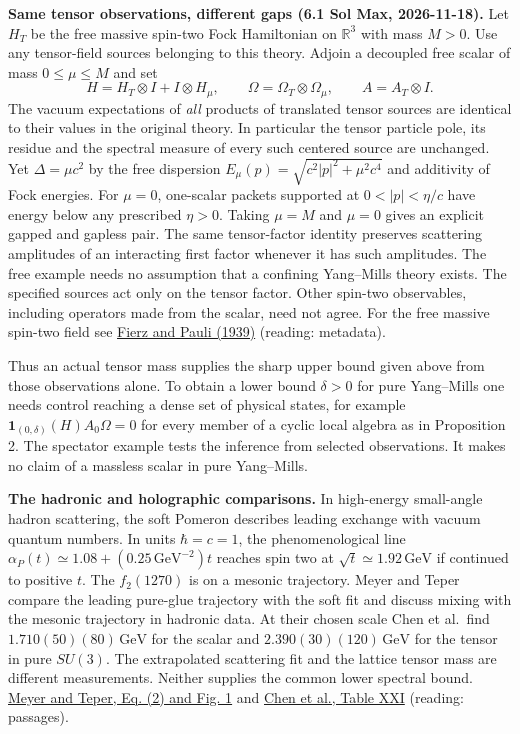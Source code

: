 \documentclass[11pt,a4paper]{article}
\begin{document}
\textbf{Same tensor observations, different gaps (6.1 Sol Max,
2026-11-18).} Let \(H_T\) be the free massive spin-two Fock Hamiltonian
on \(\mathbb R^3\) with mass \(M>0\). Use any tensor-field sources
belonging to this theory. Adjoin a decoupled free scalar of mass
\(0\le\mu\le M\) and set \[
 H=H_T\otimes I+I\otimes H_\mu,\qquad
 \Omega=\Omega_T\otimes\Omega_\mu,\qquad A=A_T\otimes I .
\] The vacuum expectations of \emph{all} products of translated tensor
sources are identical to their values in the original theory. In
particular the tensor particle pole, its residue and the spectral
measure of every such centered source are unchanged. Yet
\(\Delta=\mu c^2\) by the free dispersion
\(E_\mu(p)=\sqrt{c^2|p|^2+\mu^2c^4}\) and additivity of Fock energies.
For \(\mu=0\), one-scalar packets supported at \(0<|p|<\eta/c\) have
energy below any prescribed \(\eta>0\). Taking \(\mu=M\) and \(\mu=0\)
gives an explicit gapped and gapless pair. The same tensor-factor
identity preserves scattering amplitudes of an interacting first factor
whenever it has such amplitudes. The free example needs no assumption
that a confining Yang--Mills theory exists. The specified sources act
only on the tensor factor. Other spin-two observables, including
operators made from the scalar, need not agree. For the free massive
spin-two field see \href{https://doi.org/10.1098/rspa.1939.0140}{Fierz
and Pauli (1939)} (reading: metadata).

Thus an actual tensor mass supplies the sharp upper bound given above
from those observations alone. To obtain a lower bound \(\delta>0\) for
pure Yang--Mills one needs control reaching a dense set of physical
states, for example \(\mathbf1_{(0,\delta)}(H)A_0\Omega=0\) for every
member of a cyclic local algebra as in Proposition 2. The spectator
example tests the inference from selected observations. It makes no
claim of a massless scalar in pure Yang--Mills.

\textbf{The hadronic and holographic comparisons.} In high-energy
small-angle hadron scattering, the soft Pomeron describes leading
exchange with vacuum quantum numbers. In units \(\hbar=c=1\), the
phenomenological line
\(\alpha_P(t)\simeq1.08+(0.25\,\mathrm{GeV}^{-2})t\) reaches spin two at
\(\sqrt t\simeq1.92\,\mathrm{GeV}\) if continued to positive \(t\). The
\(f_2(1270)\) is on a mesonic trajectory. Meyer and Teper compare the
leading pure-glue trajectory with the soft fit and discuss mixing with
the mesonic trajectory in hadronic data. At their chosen scale Chen et
al.~find \(1.710(50)(80)\,\mathrm{GeV}\) for the scalar and
\(2.390(30)(120)\,\mathrm{GeV}\) for the tensor in pure \(SU(3)\). The
extrapolated scattering fit and the lattice tensor mass are different
measurements. Neither supplies the common lower spectral bound.
\href{https://arxiv.org/pdf/hep-ph/0409183}{Meyer and Teper, Eq. (2) and
Fig. 1} and \href{https://arxiv.org/pdf/hep-lat/0510074}{Chen et al.,
Table XXI} (reading: passages).
\end{document}
